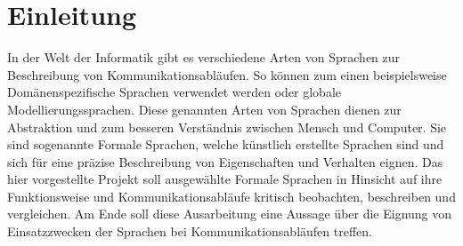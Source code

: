 \chapter{Einleitung}
\label{ch:Einleitung}
In der Welt der Informatik gibt es verschiedene Arten von Sprachen zur Beschreibung von Kommunikationsabläufen. So können zum einen beispielsweise Domänenspezifische Sprachen verwendet werden oder globale Modellierungssprachen. Diese genannten Arten von Sprachen dienen zur Abstraktion und zum besseren Verständnis zwischen Mensch und Computer. Sie sind sogenannte Formale Sprachen, welche künstlich erstellte Sprachen sind und sich für eine präzise Beschreibung von Eigenschaften und Verhalten eignen. Das hier vorgestellte Projekt soll ausgewählte Formale Sprachen in Hinsicht auf ihre Funktionsweise und  Kommunikationsabläufe kritisch beobachten, beschreiben und vergleichen. Am Ende soll diese Ausarbeitung eine Aussage über die Eignung von Einsatzzwecken der Sprachen bei Kommunikationsabläufen treffen.




